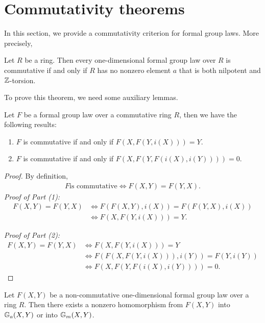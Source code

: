 \section{Commutativity theorems}
In this section, we provide a commutativity criterion for formal group laws. More precisely,

\begin{theorem}
    Let $R$ be a ring. Then every one-dimensional formal group law over $R$ is commutative if
    and only if $R$ has no nonzero element $a$ that is both nilpotent and
    $\mathbb{Z}$-torsion.
    \label{comm_thm}
\end{theorem}

To prove this theorem, we need some auxiliary lemmas.

\begin{lemma}
    Let $F$ be a formal group law over a commutative ring $R$, then we have the following results:
    \begin{enumerate}
        \item $F$ is commutative if and only if $F(X, F(Y, i(X))) = Y$.
        \item $F$ is commutative if and only if $F(X, F(Y, F(i(X), i(Y)))) = 0$.
    \end{enumerate}
    \label{lem: comm_iff}
\end{lemma}

\begin{proof}
    By definition,
    \[
    \begin{aligned}
        F \text{is commutative} \iff F(X,Y) = F(Y,X).
    \end{aligned} \]
    \textit{Proof of Part (1):}
    \[
    \begin{aligned}
        F(X,Y) = F(Y,X) & \iff F(F(X,Y), i(X)) = F(F(Y,X), i(X)) \\
        & \iff F(X, F(Y, i(X))) = Y.
    \end{aligned}\]

    \textit{Proof of Part (2):}
    \[
    \begin{aligned}
        F(X,Y) = F(Y,X) & \iff F(X, F(Y, i(X))) = Y \\
        & \iff F(F(X, F(Y, i(X))), i(Y)) = F(Y, i(Y)) \\
        & \iff F(X, F(Y, F(i(X), i(Y)))) = 0.
    \end{aligned}\]
\end{proof}

\begin{lemma}
    Let $F(X,Y)$ be a non-commutative one-dimensional formal group law over a ring
    $R$. Then there exists a nonzero homomorphism from $F(X,Y)$ into $\mathbb{G}_a(X,Y)$ or into
    $\mathbb{G}_m(X,Y)$.
    \label{lem: non_com_hom}
\end{lemma}


